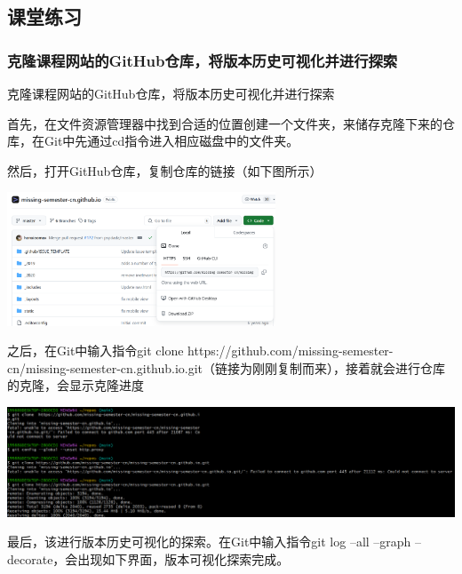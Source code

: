 \documentclass[UTF8,a4paper]{ctexart}
\begin{document}
\begin{sloppypar}
	\subsection{课堂练习}
	\subsubsection{克隆课程网站的GitHub仓库，将版本历史可视化并进行探索}
	
	
	克隆课程网站的GitHub仓库，将版本历史可视化并进行探索
	
	首先，在文件资源管理器中找到合适的位置创建一个文件夹，来储存克隆下来的仓库，在Git中先通过cd指令进入相应磁盘中的文件夹。
	
	然后，打开GitHub仓库，复制仓库的链接（如下图所示）
	
	\graphicspath{{figure/}}
	\includegraphics[width = 8cm]{1}
	
	之后，在Git中输入指令git clone https://github.com/missing-semester-cn/missing-semester-cn.github.io.git（链接为刚刚复制而来），接着就会进行仓库的克隆，会显示克隆进度
	
	\includegraphics[width = 16cm]{2}
	
	最后，该进行版本历史可视化的探索。在Git中输入指令git log --all --graph --decorate，会出现如下界面，版本可视化探索完成。
	

\end{sloppypar}
\end{document}
